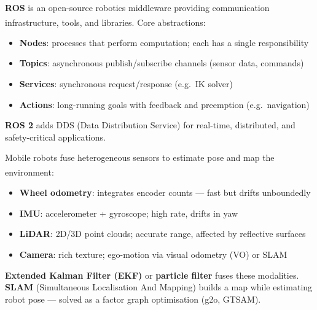 \begin{tcbitemize}[ skin=sectionraster ]
    \tcbitem[title={Robot Operating System (ROS)}, raster multicolumn=3]
    \textbf{ROS} is an open-source robotics middleware providing communication infrastructure, tools, and libraries\textsuperscript{\cite[][pp.~1309--1322]{sicilianoSpringerHandbookRobotics2016}}.
    Core abstractions:
    \begin{itemize}
        \item \textbf{Nodes}: processes that perform computation; each has a single responsibility
        \item \textbf{Topics}: asynchronous publish/subscribe channels (sensor data, commands)
        \item \textbf{Services}: synchronous request/response (e.g.\ IK solver)
        \item \textbf{Actions}: long-running goals with feedback and preemption (e.g.\ navigation)
    \end{itemize}
    \textbf{ROS 2} adds DDS (Data Distribution Service) for real-time, distributed, and safety-critical applications.

    \tcbitem[title={Sensor Fusion for Navigation}, raster multicolumn=3]
    Mobile robots fuse heterogeneous sensors to estimate pose and map the environment\textsuperscript{\cite[][pp.~80--100]{benariElementsRobotics2017}}:
    \begin{itemize}
        \item \textbf{Wheel odometry}: integrates encoder counts — fast but drifts unboundedly
        \item \textbf{IMU}: accelerometer + gyroscope; high rate, drifts in yaw
        \item \textbf{LiDAR}: 2D/3D point clouds; accurate range, affected by reflective surfaces
        \item \textbf{Camera}: rich texture; ego-motion via visual odometry (VO) or SLAM
    \end{itemize}
    \textbf{Extended Kalman Filter (EKF)} or \textbf{particle filter} fuses these modalities.
    \textbf{SLAM} (Simultaneous Localisation And Mapping) builds a map while estimating robot pose --- solved as a factor graph optimisation (g2o, GTSAM).


\end{tcbitemize}
